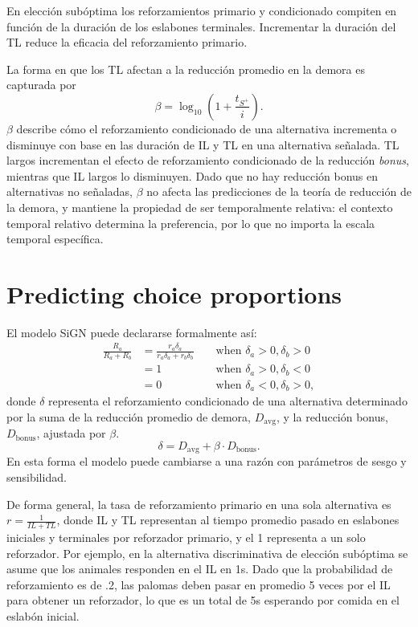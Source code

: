\documentclass[a4paper,12pt]{article}
\begin{document}
En elección subóptima los reforzamientos primario y condicionado compiten en función de la duración de los eslabones terminales.
Incrementar la duración del TL reduce la eficacia del reforzamiento primario.

La forma en que los TL afectan a la reducción promedio en la demora es capturada por
\[
    \beta = \log_{10}\left(1 + \frac{t_{S^{+}}}{i}\right)
.\]
$\beta$ describe cómo el reforzamiento condicionado de una alternativa incrementa o disminuye con base en las duración de IL y TL en una alternativa señalada.
TL largos incrementan el efecto de reforzamiento condicionado de la reducción {\itshape bonus}, mientras que IL largos lo disminuyen.
Dado que no hay reducción bonus en alternativas no señaladas, $\beta$ no afecta las predicciones de la teoría de reducción de la demora, y mantiene la propiedad de ser temporalmente relativa: el contexto temporal relativo determina la preferencia, por lo que no importa la escala temporal específica.

\section{Predicting choice proportions}

El modelo SiGN puede declararse formalmente así:
\[
    \begin{array}{cccc}
        \frac{R_a}{R_a+R_b} & =\frac{r_a \delta_a}{r_a \delta_a+r_b \delta_b} & & \mbox{ when } \delta_a>0, \delta_b>0 \\
                            & =1 & & \mbox{ when } \delta_a>0, \delta_b<0 \\
                            & =0 & & \mbox{ when } \delta_a<0, \delta_b>0,
    \end{array}
\]
donde $\delta$ representa el reforzamiento condicionado de una alternativa determinado por la suma de la reducción promedio de demora, $D_{\mbox{avg}}$, y la reducción bonus, $D_{\mbox{bonus}}$, ajustada por $\beta$.
\[
    \delta = D_{\mbox{avg}} + \beta \cdot D_{\mbox{bonus}}
.\]
En esta forma el modelo puede cambiarse a una razón con parámetros de sesgo y sensibilidad.

De forma general, la tasa de reforzamiento primario en una sola alternativa es $r = \frac{1}{IL + TL}$, donde IL y TL representan al tiempo promedio pasado en eslabones iniciales y terminales por reforzador primario, y el 1 representa a un solo reforzador.
Por ejemplo, en la alternativa discriminativa de elección subóptima se asume que los animales responden en el IL en 1s.
Dado que la probabilidad de reforzamiento es de .2, las palomas deben pasar en promedio 5 veces por el IL para obtener un reforzador, lo que es un total de 5s esperando por comida en el eslabón inicial.
\end{document}
